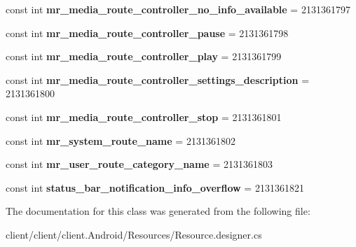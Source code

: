 \begin{DoxyCompactItemize}
\item 
\hypertarget{classClient_1_1Droid_1_1Resource_1_1String_a623e89d1aedcc821f0ad3acd3fa222bc}{}const int {\bfseries mr\+\_\+media\+\_\+route\+\_\+controller\+\_\+no\+\_\+info\+\_\+available} = 2131361797\label{classClient_1_1Droid_1_1Resource_1_1String_a623e89d1aedcc821f0ad3acd3fa222bc}

\item 
\hypertarget{classClient_1_1Droid_1_1Resource_1_1String_adac45234c667bf30012e15d94f486529}{}const int {\bfseries mr\+\_\+media\+\_\+route\+\_\+controller\+\_\+pause} = 2131361798\label{classClient_1_1Droid_1_1Resource_1_1String_adac45234c667bf30012e15d94f486529}

\item 
\hypertarget{classClient_1_1Droid_1_1Resource_1_1String_ab61ce0ee9b329a0e36cd5a6375d723b5}{}const int {\bfseries mr\+\_\+media\+\_\+route\+\_\+controller\+\_\+play} = 2131361799\label{classClient_1_1Droid_1_1Resource_1_1String_ab61ce0ee9b329a0e36cd5a6375d723b5}

\item 
\hypertarget{classClient_1_1Droid_1_1Resource_1_1String_a96e0730209e3ded407f52f08f6b69ec0}{}const int {\bfseries mr\+\_\+media\+\_\+route\+\_\+controller\+\_\+settings\+\_\+description} = 2131361800\label{classClient_1_1Droid_1_1Resource_1_1String_a96e0730209e3ded407f52f08f6b69ec0}

\item 
\hypertarget{classClient_1_1Droid_1_1Resource_1_1String_a16fb6b1cb509715b2948a4781517e342}{}const int {\bfseries mr\+\_\+media\+\_\+route\+\_\+controller\+\_\+stop} = 2131361801\label{classClient_1_1Droid_1_1Resource_1_1String_a16fb6b1cb509715b2948a4781517e342}

\item 
\hypertarget{classClient_1_1Droid_1_1Resource_1_1String_a010045709e427e00254e2d32bc051508}{}const int {\bfseries mr\+\_\+system\+\_\+route\+\_\+name} = 2131361802\label{classClient_1_1Droid_1_1Resource_1_1String_a010045709e427e00254e2d32bc051508}

\item 
\hypertarget{classClient_1_1Droid_1_1Resource_1_1String_abb8b211bced3e35f76a0171728b8b730}{}const int {\bfseries mr\+\_\+user\+\_\+route\+\_\+category\+\_\+name} = 2131361803\label{classClient_1_1Droid_1_1Resource_1_1String_abb8b211bced3e35f76a0171728b8b730}

\item 
\hypertarget{classClient_1_1Droid_1_1Resource_1_1String_ac7ccf53f4b5ba43e498008264b5ecea3}{}const int {\bfseries status\+\_\+bar\+\_\+notification\+\_\+info\+\_\+overflow} = 2131361821\label{classClient_1_1Droid_1_1Resource_1_1String_ac7ccf53f4b5ba43e498008264b5ecea3}

\end{DoxyCompactItemize}


The documentation for this class was generated from the following file\+:\begin{DoxyCompactItemize}
\item 
client/client/client.\+Android/\+Resources/Resource.\+designer.\+cs\end{DoxyCompactItemize}
